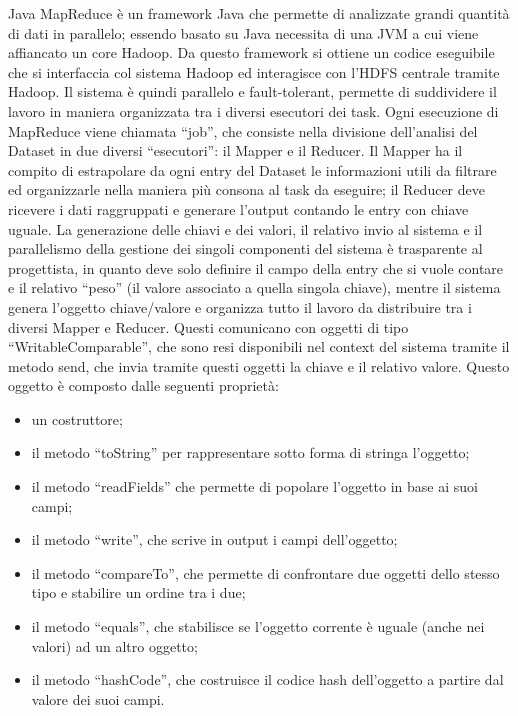 \documentclass[11pt]{report} %
\begin{document}
Java MapReduce è un framework Java che permette di analizzate grandi quantità di dati in parallelo; essendo basato su Java necessita di una JVM a cui viene affiancato un core Hadoop. Da questo framework si ottiene un codice eseguibile che si interfaccia col sistema Hadoop ed interagisce con l'HDFS centrale tramite Hadoop. Il sistema è quindi parallelo e fault-tolerant, permette di suddividere il lavoro in maniera organizzata tra i diversi esecutori dei task. Ogni esecuzione di MapReduce viene chiamata ``job'', che consiste nella divisione dell'analisi del Dataset in due diversi ``esecutori'': il Mapper e il Reducer. Il Mapper ha il compito di estrapolare da ogni entry del Dataset le informazioni utili da filtrare ed organizzarle nella maniera più consona al task da eseguire; il Reducer deve ricevere i dati raggruppati e generare l'output contando le entry con chiave uguale. La generazione delle chiavi e dei valori, il relativo invio al sistema e il parallelismo della gestione dei singoli componenti del sistema è trasparente al progettista, in quanto deve solo definire il campo della entry che si vuole contare e il relativo ``peso'' (il valore associato a quella singola chiave), mentre il sistema genera l'oggetto chiave/valore e organizza tutto il lavoro da distribuire tra i diversi Mapper e Reducer.  Questi comunicano con oggetti di tipo ``WritableComparable'', che sono resi disponibili nel context del sistema tramite il metodo send, che invia tramite questi oggetti la chiave e il relativo valore. Questo oggetto è composto dalle seguenti proprietà:
\begin{itemize}
\item  un costruttore; 
\item il metodo ``toString'' per rappresentare sotto forma di stringa l'oggetto; 
\item il metodo ``readFields'' che permette di popolare l'oggetto in base ai suoi campi; 
\item il metodo ``write'', che scrive in output i campi dell'oggetto; 
\item il metodo ``compareTo'', che permette di confrontare due oggetti dello stesso tipo e stabilire un ordine tra i due;
\item il metodo ``equals'', che stabilisce se l'oggetto corrente è uguale (anche nei valori) ad un altro oggetto;
\item il metodo ``hashCode'', che costruisce il codice hash dell'oggetto a partire dal valore dei suoi campi.
\end{itemize}
\end{document}
